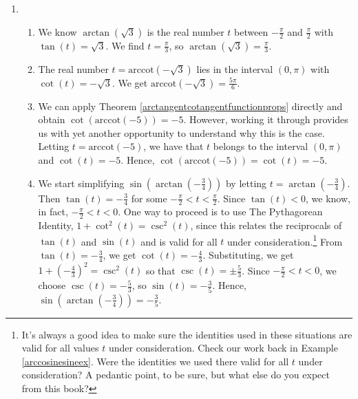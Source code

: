 \begin{ex}
\begin{enumerate}

\item

\begin{enumerate}

\item  We know $\arctan(\sqrt{3})$ is the real number $t$ between $-\frac{\pi}{2}$ and $\frac{\pi}{2}$ with $\tan(t) = \sqrt{3}$.  We find $t = \frac{\pi}{3}$, so $\arctan(\sqrt{3}) = \frac{\pi}{3}$.

\item The real number $t = \mbox{arccot}(-\sqrt{3})$ lies in the interval $(0,\pi)$ with $\cot(t) = -\sqrt{3}$.  We get $\mbox{arccot}(-\sqrt{3}) = \frac{5\pi}{6}$.

\item  We can apply Theorem \ref{arctangentcotangentfunctionprops} directly and obtain $\cot(\mbox{arccot}(-5)) = -5$.  However, working it through provides us with yet another opportunity to understand why this is the case. Letting $t = \mbox{arccot}(-5)$, we have that $t$ belongs to the interval $(0,\pi)$ and $\cot(t)=-5$.  Hence, $\cot(\mbox{arccot}(-5)) = \cot(t)=-5$.

\item   We start simplifying  $\sin\left(\arctan\left(-\frac{3}{4}\right)\right)$ by letting $t = \arctan\left(-\frac{3}{4}\right)$.  Then $\tan(t) = -\frac{3}{4}$ for some $-\frac{\pi}{2} < t < \frac{\pi}{2}$.  Since $\tan(t) < 0$, we know, in fact, $-\frac{\pi}{2} < t < 0$.  One way to proceed is to use The Pythagorean Identity, $1 + \cot^{2}(t) = \csc^{2}(t)$, since this relates the reciprocals of $\tan(t)$ and $\sin(t)$ and is valid for all $t$ under consideration.\footnote{It's always a good idea to make sure the identities used in these situations are valid for all values $t$ under consideration.  Check our work back in Example \ref{arccosinesineex}.  Were the identities we used there valid for all $t$ under consideration?  A pedantic point, to be sure, but what else do you expect from this book?}   From  $\tan(t) = -\frac{3}{4}$, we get $\cot(t) = -\frac{4}{3}$.  Substituting, we get $1 + \left(-\frac{4}{3}\right)^2 = \csc^{2}(t)$ so that $\csc(t) = \pm \frac{5}{3}$.  Since $-\frac{\pi}{2} < t < 0$, we choose $\csc(t) = -\frac{5}{3}$, so $\sin(t) = -\frac{3}{5}$. Hence, $\sin\left(\arctan\left(-\frac{3}{4}\right)\right) = -\frac{3}{5}$.

\end{enumerate}


\end{enumerate}
\end{ex}
